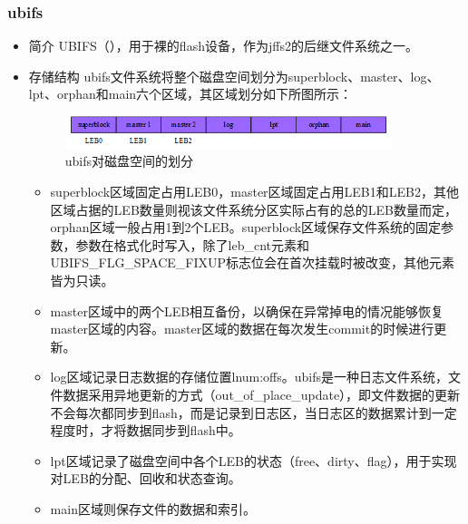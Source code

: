 \documentclass[UTF8,a4paper]{ctexart}
\begin{document}
\subsubsection{ubifs}
\begin{itemize}
\item 简介
UBIFS（），用于裸的flash设备，作为jffs2的后继文件系统之一。
\item 存储结构
ubifs文件系统将整个磁盘空间划分为superblock、master、log、lpt、orphan和main六个区域，其区域划分如下所图所示：

	\begin{figure}[H]
		\centering
		\includegraphics[width=0.9\textwidth]{UBIFS.png}
		\caption{ubifs对磁盘空间的划分}
	\end{figure}
	\begin{itemize}
		\item superblock区域固定占用LEB0，master区域固定占用LEB1和LEB2，其他区域占据的LEB数量则视该文件系统分区实际占有的总的LEB数量而定，orphan区域一般占用1到2个LEB。superblock区域保存文件系统的固定参数，参数在格式化时写入，除了leb\_cnt元素和UBIFS\_FLG\_SPACE\_FIXUP标志位会在首次挂载时被改变，其他元素皆为只读。
		\item master区域中的两个LEB相互备份，以确保在异常掉电的情况能够恢复master区域的内容。master区域的数据在每次发生commit的时候进行更新。
		\item log区域记录日志数据的存储位置lnum:offs。ubifs是一种日志文件系统，文件数据采用异地更新的方式（out\_of\_place\_update），即文件数据的更新不会每次都同步到flash，而是记录到日志区，当日志区的数据累计到一定程度时，才将数据同步到flash中。
		\item lpt区域记录了磁盘空间中各个LEB的状态（free、dirty、flag），用于实现对LEB的分配、回收和状态查询。
		\item main区域则保存文件的数据和索引。
	\end{itemize}
\end{itemize}
\end{document}
